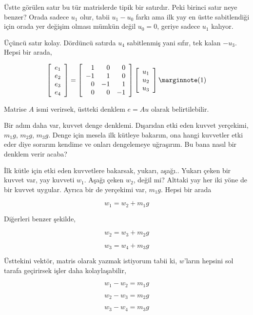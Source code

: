 \documentclass[12pt,fleqn]{article}\usepackage{../../common}
\begin{document}
Üstte görülen satır bu tür matrislerde tipik bir satırdır. Peki birinci
satır neye benzer? Orada sadece $u_1$ olur, tabii $u_1 - u_0$ farkı
ama ilk yay en üstte sabitlendiği için orada yer değişim olması mümkün
değil $u_0 = 0$, geriye sadece $u_1$ kalıyor.

Üçüncü satır kolay. Dördüncü satırda $u_4$ sabitlenmiş yani sıfır,
tek kalan $-u_3$. Hepsi bir arada,

$$
\left[\begin{array}{c}
e_1 \\ e_2 \\ e_3 \\ e_4
\end{array}\right] =
\left[\begin{array}{rrrr}
1 & 0 & 0 \\ -1 & 1 & 0 \\ 0 & -1 & 1 \\ 0 & 0 & -1
\end{array}\right]
\left[\begin{array}{c}
u_1 \\ u_2 \\ u_3 
\end{array}\right]
\mlabel{1}
$$

Matrise $A$ ismi verirsek, üstteki denklem $e = A u $ olarak belirtilebilir.

Bir adım daha var, kuvvet denge denklemi. Dışarıdan etki eden kuvvet yerçekimi,
$m_1 g$, $m_2 g$, $m_3 g$. Denge için mesela ilk kütleye bakarım, ona hangi
kuvvetler etki eder diye sorarım kendime ve onları dengelemeye uğraşırım.
Bu bana nasıl bir denklem verir acaba?

İlk kütle için etki eden kuvvetlere bakarsak, yukarı, aşağı.. Yukarı çeken bir
kuvvet var, yay kuvveti $w_1$. Aşağı çeken $w_2$, değil mi? Alttaki yay her iki
yöne de bir kuvvet uygular. Ayrıca bir de yerçekimi var, $m_1 g$. Hepsi bir
arada

$$
w_1 = w_2 + m_1 g
$$

Diğerleri benzer şekilde,

$$
w_2 = w_3 + m_2 g
$$

$$
w_3 = w_4 + m_3 g
$$

Üsttekini vektör, matris olarak yazmak istiyorum tabii ki, $w$'ların
hepsini sol tarafa geçirirsek işler daha kolaylaşabilir,


$$
w_1 - w_2 = m_1 g
$$

$$
w_2 - w_3 = m_2 g
$$

$$
w_3 - w_4 = m_3 g
$$
\end{document}
